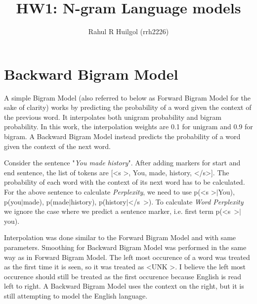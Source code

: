 \documentclass{article}
\begin{document}
\title{HW1: N-gram Language models}
\author{Rahul R Huilgol (rrh2226)}
\maketitle

\section{Backward Bigram Model}
A simple Bigram Model (also referred to below as Forward Bigram Model for the sake of clarity) works by predicting the probability of a word given the context of the previous word. It interpolates both unigram probability and bigram probability. In this work, the interpolation weights are 0.1 for unigram and 0.9 for bigram. A Backward Bigram Model instead predicts the probability of a word given the context of the next word. 

Consider the sentence "\textit{You made history}". After adding markers for start and end sentence, the list of tokens are [\textless s \textgreater, You, made, history, \textless/s\textgreater]. The probability of each word with the context of its next word has to be calculated.  For the above sentence to calculate \textit{Perplexity}, we need to use p(\textless s \textgreater$|$You), p(you$|$made), p(made$|$history), p(history$|$\textless/s\ \textgreater).  To calculate \textit{Word Perplexity} we ignore the case where we predict a sentence marker, i.e. first term p(\textless s\ \textgreater$|$you). 

Interpolation was done similar to the Forward Bigram Model and with same parameters. Smoothing for Backward Bigram Model was performed in the same way as in Forward Bigram Model. The left most occurence of a word was treated as the first time it is seen, so it was treated as \textless UNK \textgreater. I believe the left most occurence should still be treated as the first occurence because English is read left to right.  A Backward Bigram Model uses the context on the right, but it is still attempting to model the English language. 
\end{document}
